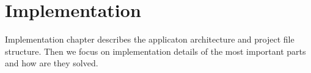 \chapter{Implementation}
Implementation chapter describes the applicaton architecture and project file structure. Then we focus on implementation details of the most important parts and how are they solved.